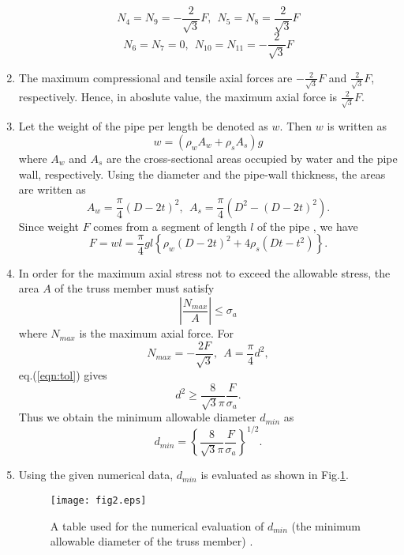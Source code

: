 \documentclass[10pt,a4j]{article}
\begin{document}
\begin{enumerate}
\[	\]
	\[
		N_4=N_9=-\frac{2}{\sqrt{3}}F ,\ \ N_5=N_8=\frac{2}{\sqrt{3}}F
	\]
	\[
		N_6=N_7=0, \ \ N_{10}=N_{11}=-\frac{2}{\sqrt{3}}F
	\]
\item
	The maximum compressional and tensile axial forces are $-\frac{2}{\sqrt{3}}F$ 
	and $\frac{2}{\sqrt{3}}F$, respectively. Hence, in aboslute value, the maximum axial force is $\frac{2}{\sqrt{3}}F$.
\item
	Let the weight of the pipe per length be denoted as $w$. Then $w$ is written as 
	\begin{equation}
		w= \left( \rho_w A_w + \rho_s A_s \right)g
		\label{eqn:}
	\end{equation}
	where $A_w$ and $A_s$ are the cross-sectional areas occupied by 
	water and the pipe wall, respectively. Using the diameter and the pipe-wall thickness, 
	the areas are written as 
	\begin{equation}
		A_w=\frac{\pi}{4}(D-2t)^2, \ \ A_s=\frac{\pi}{4}\left(D^2-(D-2t)^2\right).
		\label{eqn:}
	\end{equation}
	Since weight $F$ comes from a segment of length $l$ of the pipe , we have
	\begin{equation}
		F=wl=
		\frac{\pi}{4}gl
		\left\{ 
			\rho_w(D-2t)^2+ 4\rho_s\left(Dt-t^2\right)
		\right\}.
		\label{eqn:F_explicit}
	\end{equation}
\item
	In order for the maximum axial stress not to exceed the allowable stress, the area 
	$A$ of the truss member must satisfy 
	\begin{equation}
		\left| \frac{N_{max}}{A}\right| \leq \sigma_a
		\label{eqn:tol}
	\end{equation}
	where $N_{max}$ is the maximum axial force.
	For 
	\[ 
		N_{max}=-\frac{2F}{\sqrt{3}}, \ \ A=\frac{\pi}{4}d^2, 
	\]
	eq.(\ref{eqn:tol}) gives
	\begin{equation}
		d^2 \geq  \frac{8}{\sqrt{3}\pi} \frac{F}{\sigma_a}.
		\label{eqn:}
	\end{equation}
	Thus we obtain the minimum allowable diameter $d_{min}$ as 
	\begin{equation}
		d_{min}=
		\left\{ \frac{8}{\sqrt{3}\pi} \frac{F}{\sigma_a}
		\right\}^{1/2}.
		\label{eqn:dmin}
	\end{equation}
\item
	Using the given numerical data, $d_{min}$ is evaluated as shown in Fig.\ref{fig:fig4}.
	\begin{figure}[h]
	\begin{center}
	\texttt{[image: fig2.eps]} 
	\end{center}
	\caption{A table used for the numerical evaluation of $d_{min}$ (the minimum allowable diameter of the truss member) .} 
	\label{fig:fig4}
	\end{figure}
\end{enumerate}
\end{document}
